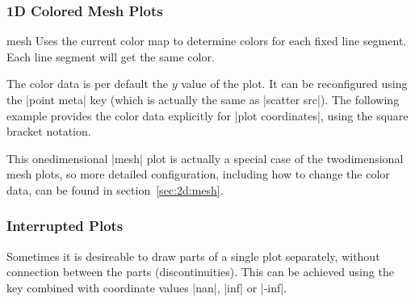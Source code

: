\subsubsection{1D Colored Mesh Plots}
\begin{plottype}{mesh}
	Uses the current color map to determine colors for each fixed line segment. Each line segment will get the same color.
\begin{codeexample}[]
\end{codeexample}
	The color data is per default the $y$ value of the plot. It can be reconfigured using the |point meta| key (which is actually the same as |scatter src|). The following example provides the color data explicitly for |plot coordinates|, using the square bracket notation.
\begin{codeexample}[]
\end{codeexample}
	This onedimensional |mesh| plot is actually a special case of the twodimensional mesh plots, so more detailed configuration, including how to change the color data, can be found in section~\ref{sec:2d:mesh}.

\end{plottype}


\subsubsection{Interrupted Plots}
%
\label{pgfplots:interrupt}%
Sometimes it is desireable to draw parts of a single plot separately, without connection between the parts (discontinuities). This can be achieved using the  key combined with coordinate values |nan|, |inf| or |-inf|.

